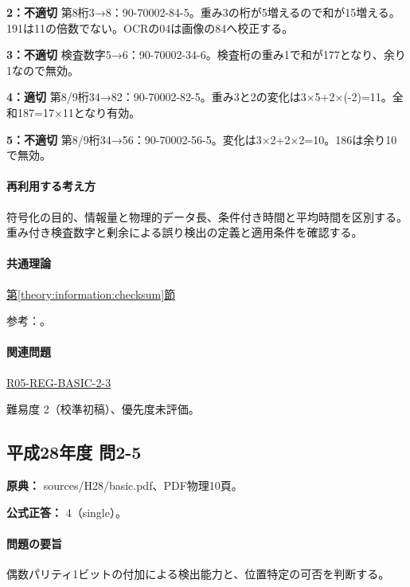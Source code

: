 \noindent\textbf{2：不適切} 第8桁3→8：90-70002-84-5。重み3の桁が5増えるので和が15増える。191は11の倍数でない。OCRの04は画像の84へ校正する。\par

\noindent\textbf{3：不適切} 検査数字5→6：90-70002-34-6。検査桁の重み1で和が177となり、余り1なので無効。\par

\noindent\textbf{4：適切} 第8/9桁34→82：90-70002-82-5。重み3と2の変化は3×5+2×(-2)=\allowbreak{}11。全和187=\allowbreak{}17×11となり有効。\par

\noindent\textbf{5：不適切} 第8/9桁34→56：90-70002-56-5。変化は3×2+2×2=\allowbreak{}10。186は余り10で無効。\par

\paragraph{再利用する考え方} 符号化の目的、情報量と物理的データ長、条件付き時間と平均時間を区別する。重み付き検査数字と剰余による誤り検出の定義と適用条件を確認する。

\paragraph{共通理論} \hyperref[theory:information:checksum]{第\ref*{theory:information:checksum}節}

\par 参考：\cite{info_errors}。

\paragraph{関連問題} \hyperref[q:r05-reg-basic-2-3]{R05-REG-BASIC-2-3}

\par 難易度 2（校準初稿）、優先度未評価。

\subsection{平成28年度 問2-5}
\label{q:h28-reg-basic-2-5}

\noindent\textbf{原典：} sources/H28/basic.pdf、PDF物理10頁。

\textbf{公式正答：} 4（single）。

\paragraph{問題の要旨} 偶数パリティ1ビットの付加による検出能力と、位置特定の可否を判断する。

